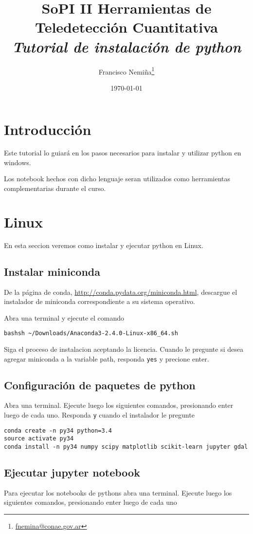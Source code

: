 \documentclass[hidelinks,12pt]{article}
\title{SoPI II \- Herramientas de Teledetecci\'on Cuantitativa \\ 
\emph{Tutorial de instalaci\'on de python}}
\author{Francisco
Nemi\~na\thanks{\href{mailto:fnemina@conae.govar}{fnemina@conae.gov.ar}}}
\affil{Unidad de Educaci\'on y Formaci\'on Masiva\\ 
    Comisi\'on Nacional de Actividades Espaciales}
\date{\today}
\begin{document}
\maketitle

\section*{Introducci\'on}
Este tutorial lo guiar\'a en los pasos necesarios para instalar y utilizar
python en windows.

Los notebook hechos con dicho lenguaje seran utilizados como herramientas
complementarias durante el curso.

\section{Linux}
En esta seccion veremos como instalar y ejecutar python en Linux.

\subsection{Instalar miniconda}

De la p\'agina de conda, \url{http://conda.pydata.org/miniconda.html}, descargue 
el instalador de miniconda correspondiente a su sistema operativo. 

Abra una terminal y ejecute el comando

\begin{verbatim}
bashsh ~/Downloads/Anaconda3-2.4.0-Linux-x86_64.sh
\end{verbatim}

Siga el proceso de instalacion aceptando la licencia. Cuando le pregunte si
desea agregar miniconda a la variable path, responda \texttt{yes} y precione
enter.

\subsection{Configuraci\'on de paquetes de python}

Abra una terminal. Ejecute luego los siguientes comandos, presionando enter
luego de cada uno. Responda \texttt{y} cuando el instalador le pregunte 

\begin{verbatim}
conda create -n py34 python=3.4
source activate py34
conda install -n py34 numpy scipy matplotlib scikit-learn jupyter gdal
\end{verbatim}

\subsection{Ejecutar jupyter notebook}
Para ejecutar los notebooks de pythons abra una terminal. Ejecute luego los 
siguientes comandos, presionando enter luego de cada uno
\end{document}

